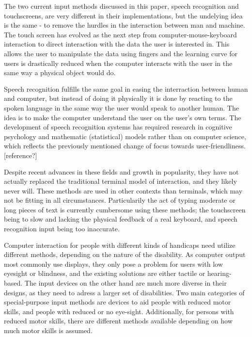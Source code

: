 
The two current input methods discussed in this paper, speech recognition and touchscreens, are very different in their implementations, but the undelying idea is the same - to remove the hurdles in the interaction between man and machine. The touch screen has evolved as the next step from computer-mouse-keyboard interaction to direct interaction with the data the user is interested in. This allows the user to manipulate the data using fingers and the learning curve for users is drastically reduced when the computer interacts with the user in the same way a physical object would do.

Speech recognition fulfills the same goal in easing the interraction between human and computer, but instead of doing it physically it is done by reacting to the spoken language in the same way the user would speak to another human. The idea is to make the computer understand the user on the user's own terms. The development of speech recognition systems has required research in cognitive psychology and mathematic (statistical) models rather than on computer science, which reflects the previously mentioned change of focus towards user-friendliness.[reference?] 

Despite recent advances in these fields and growth in popularity, they have not actually replaced the traditional terminal model of interaction, and they likely never will. These methods are used in other contexts than terminals, which may not be fitting in all circumstances. Particularily the act of typing moderate or long pieces of text is currently cumbersome using these methods; the touchscreen being to slow and lacking the physical feedback of a real keyboard, and speech recognition input being too inaccurate.


Computer interaction for people with different kinds of handicaps need utilize different methods, depending on the nature of the disability. As computer output most commonly use displays, they only pose a problem for users with low eyesight or blindness, and the existing solutions are either tactile or hearing-based. The input devices on the other hand are much more diverse in their designs, as they need to adress a larger set of disabilities. Two main categories of special-purpose input methods are devices to aid people with reduced motor skills, and people with reduced or no eye-sight. Additionally, for persons with reduced motor skills, there are different methods available depending on how much motor skills is assumed.

